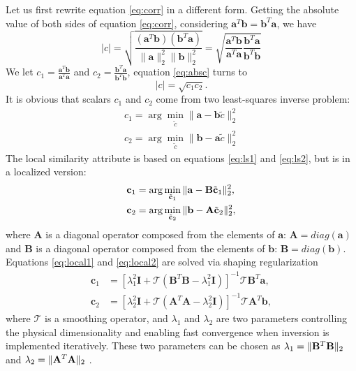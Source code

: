 Let us first rewrite equation \ref{eq:corr} in a different form. Getting the absolute value of both sides of equation \ref{eq:corr}, considering $\mathbf{a}^T\mathbf{b}=\mathbf{b}^T\mathbf{a}$, we have
\begin{equation}
\label{eq:absc}
|c|=\sqrt{ \frac{(\mathbf{a}^T\mathbf{b})(\mathbf{b}^T\mathbf{a})}{\parallel \mathbf{a} \parallel_2^2 \parallel\mathbf{b} \parallel_2^2} }=
\sqrt{\frac{\mathbf{a}^T\mathbf{b}}{\mathbf{a}^T\mathbf{a}} \frac{\mathbf{b}^T\mathbf{a}}{\mathbf{b}^T\mathbf{b}}} %
\end{equation}
We let $c_1=\frac{\mathbf{a}^T\mathbf{b}}{\mathbf{a}^T\mathbf{a}}$ and $c_2=\frac{\mathbf{b}^T\mathbf{a}}{\mathbf{b}^T\mathbf{b}}$, equation \ref{eq:absc} turns to 
\begin{equation}
\label{eq:cc}
|c|=\sqrt{c_1c_2}.
\end{equation}
It is obvious that scalars $c_1$ and $c_2$ come from two least-squares inverse problem:
\begin{align}
\label{eq:ls1}
c_1 = \arg \min_{\tilde{c}} \parallel \mathbf{a}-\mathbf{b}\tilde{c} \parallel_2^2 \\
\label{eq:ls2}
c_2 = \arg\min_{\tilde{c}} \parallel \mathbf{b}-\mathbf{a}\tilde{c} \parallel_2^2 
\end{align}
The local similarity attribute is based on equations \ref{eq:ls1} and \ref{eq:ls2}, but is in a localized version: 
\begin{align}
\label{eq:local1}
\mathbf{c}_1 &=\arg\min_{\tilde{\mathbf{c}}_1}\Arrowvert \mathbf{a}-\mathbf{B}\tilde{\mathbf{c}}_1 \Arrowvert_2^2, \\
\label{eq:local2}
\mathbf{c}_2 &=\arg\min_{\tilde{\mathbf{c}}_2}\Arrowvert \mathbf{b}-\mathbf{A}\tilde{\mathbf{c}}_2 \Arrowvert_2^2,
\end{align}
where $\mathbf{A}$ is a diagonal operator composed from the elements of $\mathbf{a}$: $\mathbf{A}=diag(\mathbf{a})$ and $\mathbf{B}$ is a diagonal operator composed from the elements of $\mathbf{b}$: $\mathbf{B}=diag(\mathbf{b})$.
Equations \ref{eq:local1} and \ref{eq:local2} are solved via shaping regularization
\begin{align}
\label{eq:local3}
\mathbf{c}_1 &= [\lambda_1^2\mathbf{I} + \mathcal{T}(\mathbf{B}^T\mathbf{B}-\lambda_1^2\mathbf{I})]^{-1}\mathcal{T}\mathbf{B}^T\mathbf{a},\\
\label{eq:local4}
\mathbf{c}_2 &= [\lambda_2^2\mathbf{I} + \mathcal{T}(\mathbf{A}^T\mathbf{A}-\lambda_2^2\mathbf{I})]^{-1}\mathcal{T}\mathbf{A}^T\mathbf{b},
\end{align}
where $\mathbf{\mathcal{T}}$ is a smoothing operator, and $\lambda_1$ and $\lambda_2$ are two parameters controlling the physical dimensionality and enabling fast convergence when inversion is implemented iteratively. These two parameters can be chosen as $\lambda_1  = \Arrowvert\mathbf{B}^T\mathbf{B}\Arrowvert_2$ and $\lambda_2  = \Arrowvert\mathbf{A}^T\mathbf{A}\Arrowvert_2$ \cite[]{fomel2007localattr}.

